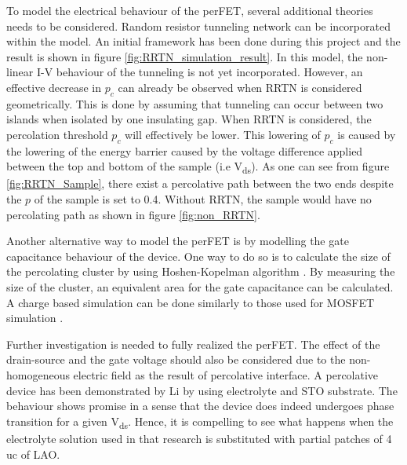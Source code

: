 \documentclass[11pt,a4paper]{report}
\begin{document}
To model the electrical behaviour of the perFET, several additional theories needs to be considered. Random resistor tunneling network can be incorporated within the model. An initial framework has been done during this project and the result is shown in figure \ref{fig:RRTN_simulation_result}. In this model, the non-linear I-V behaviour of the tunneling is not yet incorporated. However, an effective decrease in $p_c$ can already be observed when RRTN is considered geometrically. This is done by assuming that tunneling can occur between two islands when isolated by one insulating gap. When RRTN is considered, the percolation threshold $p_c$ will effectively be lower. This lowering of $p_c$ is caused by the lowering of the energy barrier caused by the voltage difference applied between the top and bottom of the sample (i.e V\textsubscript{ds}). As one can see from figure \ref{fig:RRTN_Sample}, there exist a percolative path between the two ends despite the $p$ of the sample is set to 0.4. Without RRTN, the sample would have no percolating path as shown in figure \ref{fig:non_RRTN}.

Another alternative way to model the perFET is by modelling the gate capacitance behaviour of the device. One way to do so is to calculate the size of the percolating cluster by using Hoshen-Kopelman algorithm \cite{percolation_simulation}. By measuring the size of the cluster, an equivalent area for the gate capacitance can be calculated. A charge based simulation can be done similarly to those used for MOSFET simulation \cite{Semiconductor_explained_more}.

Further investigation is needed to fully realized the perFET. The effect of the drain-source and the gate voltage should also be considered due to the non-homogeneous electric field as the result of percolative interface. A percolative device has been demonstrated by Li \cite{li_graf_schladt_jiang_parkin_2012} by using electrolyte and STO substrate. The behaviour shows promise in a sense that the device does indeed undergoes phase transition for a given V\textsubscript{ds}. Hence, it is compelling to see what happens when the electrolyte solution used in that research is substituted with partial patches of 4 uc of LAO.
\end{document}
